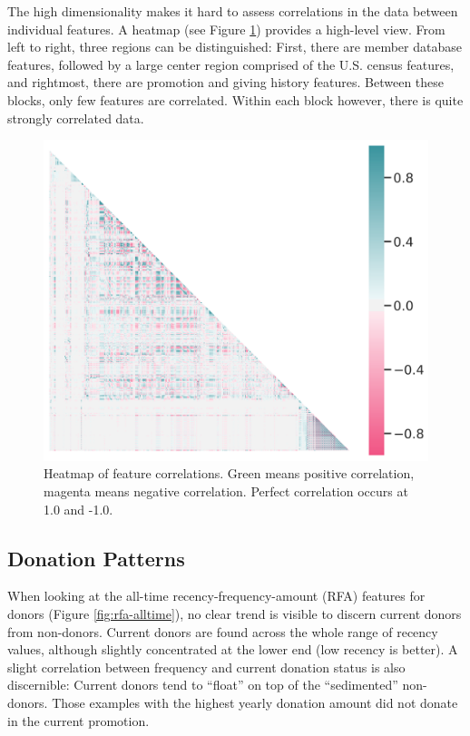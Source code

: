 \documentclass[
  11pt,
  a4paper,
  DIV=12,captions=tableheading,oneside,titlepage]{scrbook}
\begin{document}
The high dimensionality makes it hard to assess correlations in the data between individual features. A heatmap (see Figure \ref{fig:heatmap-all}) provides a high-level view. From left to right, three regions can be distinguished: First, there are member database features, followed by a large center region comprised of the U.S. census features, and rightmost, there are promotion and giving history features. Between these blocks, only few features are correlated. Within each block however, there is quite strongly correlated data.



\begin{figure}

{\centering \includegraphics[width=0.7\linewidth]{figures/eda/correlations-all} 

}

\caption{Heatmap of feature correlations. Green means positive correlation, magenta means negative correlation. Perfect correlation occurs at 1.0 and -1.0.}\label{fig:heatmap-all}
\end{figure}

\hypertarget{donation-patterns}{%
\subsection{Donation Patterns}\label{donation-patterns}}

When looking at the all-time recency-frequency-amount (RFA) features for donors (Figure \ref{fig:rfa-alltime}), no clear trend is visible to discern current donors from non-donors. Current donors are found across the whole range of recency values, although slightly concentrated at the lower end (low recency is better). A slight correlation between frequency and current donation status is also discernible: Current donors tend to ``float'' on top of the ``sedimented'' non-donors. Those examples with the highest yearly donation amount did not donate in the current promotion.
\end{document}
